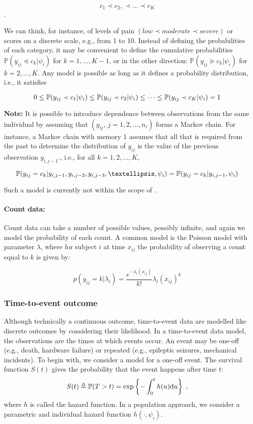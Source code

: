 $$c_1 \prec c_2,\prec \ldots \prec c_K $$.

We can think, for instance, of levels of pain $(low \prec moderate \prec severe)$ or scores on a discrete scale, e.g., from 1 to 10. Instead of defining the probabilities of each category, it may be convenient to define the cumulative probabilities $\mathbb{P}(y_{ij} \preceq c_k | \psi_i)$ for $k=1,\ldots ,K-1$, or in the other direction: $\mathbb{P}(y_{ij} \succeq c_k | \psi_i)$ for $k=2,\ldots, K$. Any model is possible as long as it defines a probability distribution, i.e., it satisfies

$$0\leq\mathbb{P}(y_{ij}\prec c_1|\psi_i)\leq\mathbb{P}(y_{ij}\prec c_2|\psi_i)\leq \cdots \leq\mathbb{P}(y_{ij}\prec c_K|\psi_i)=1$$


{\bf Note:} It is possible to introduce dependence between observations from the same individual by assuming that $(y_{ij},\,j=1,2,\ldots,n_i)$ forms a Markov chain. For instance, a Markov chain with memory 1 assumes that all that is required from the past to determine the distribution of $y_{ij}$ is the value of the previous observation $y_{i,j-1}$., i.e., for all $k=1,2,\ldots ,K$,

$$\prob(y_{ij}=c_k|y_{i,j-1},y_{i,j-2},y_{i,j-3},…,\psi_i)=\prob(y_{ij}=c_k|y_{i,j-1},\psi_i)$$

Such a model is currently not within the scope of \saemix.

\paragraph{Count data:} Count data can take a number of possible values, possibly infinite, and again we model the probability of each count. A common model is the Poisson model with parameter $\lambda$, where for subject $i$ at time $x_{ij}$ the probability of observing a count equal to $k$ is given by:

$$p(y_{ij} = k | \lambda_i) = \dfrac{e^{-\lambda_i(x_{ij})}}{k!}\lambda_i(x_{ij})^k $$

\subsubsection{Time-to-event outcome}

Although technically a continuous outcome, time-to-event data are modelled like discrete outcomes by considering their likelihood. In a time-to-event data model, the observations are the times at which events occur. An event may be one-off (e.g., death, hardware failure) or repeated (e.g., epileptic seizures, mechanical incidents).
To begin with, we consider a model for a one-off event. The survival function $S(t)$ gives the probability that the event happens after time $t$:
\begin{equation}\label{survival}
S(t)  \triangleq \mathbb{P}(T >t) = \exp\left\{-\int_{0}^{t}h(u)\textrm{d}u\right\}\;,
\end{equation}
where $h$ is called the hazard function. 
In a population approach, we consider a parametric and individual hazard function $h(\cdot,\psi_i)$.


